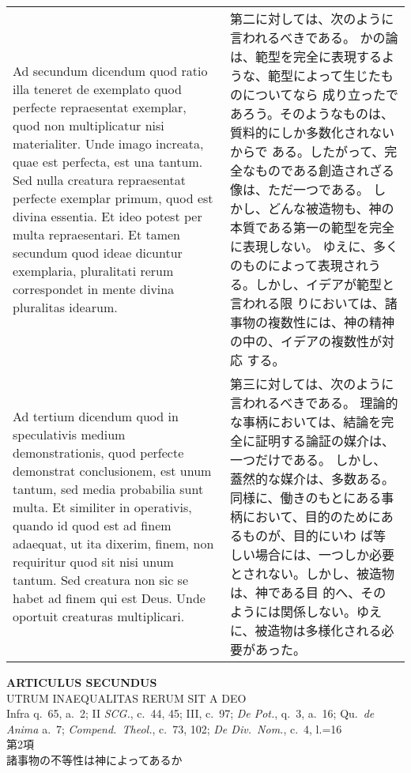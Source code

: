\documentclass[10pt]{jsarticle} %
\begin{document}
\begin{longtable}{p{21em}p{21em}}
\\





{\sc Ad secundum dicendum} quod ratio illa teneret
 de exemplato quod perfecte repraesentat exemplar, quod non
 multiplicatur nisi materialiter. Unde imago increata, quae est
 perfecta, est una tantum. Sed nulla creatura repraesentat perfecte
 exemplar primum, quod est divina essentia. Et ideo potest per multa
 repraesentari. Et tamen secundum quod ideae dicuntur exemplaria,
 pluralitati rerum correspondet in mente divina pluralitas idearum.

&

第二に対しては、次のように言われるべきである。
かの論は、範型を完全に表現するような、範型によって生じたものについてなら
 成り立ったであろう。そのようなものは、質料的にしか多数化されないからで
 ある。したがって、完全なものである創造されざる像は、ただ一つである。
しかし、どんな被造物も、神の本質である第一の範型を完全に表現しない。
ゆえに、多くのものによって表現されうる。しかし、イデアが範型と言われる限
 りにおいては、諸事物の複数性には、神の精神の中の、イデアの複数性が対応
 する。


\\





{\sc Ad tertium dicendum} quod in speculativis
 medium demonstrationis, quod perfecte demonstrat conclusionem, est unum
 tantum, sed media probabilia sunt multa. Et similiter in operativis,
 quando id quod est ad finem adaequat, ut ita dixerim, finem, non
 requiritur quod sit nisi unum tantum. Sed creatura non sic se habet ad
 finem qui est Deus. Unde oportuit creaturas multiplicari.


&

第三に対しては、次のように言われるべきである。
理論的な事柄においては、結論を完全に証明する論証の媒介は、一つだけである。
 しかし、蓋然的な媒介は、多数ある。
同様に、働きのもとにある事柄において、目的のためにあるものが、目的にいわ
 ば等しい場合には、一つしか必要とされない。しかし、被造物は、神である目
 的へ、そのようには関係しない。ゆえに、被造物は多様化される必要があった。




\end{longtable}
\newpage
{}

\begin{center}
 {\Large {\bf ARTICULUS SECUNDUS}}\\
 {\large UTRUM INAEQUALITAS RERUM SIT A DEO}\\
 {\footnotesize Infra q.~65, a.~2; II {\it SCG.}, c.~44, 45; III, c.~97;
 {\itshape De Pot.}, q.~3, a.~16; Qu.~{\itshape de Anima} a.~7;
 {\itshape Compend.~Theol.}, c.~73, 102; {\itshape De Div.~Nom.}, c.~4,
 l.=16}\\
{\Large 第2項\\諸事物の不等性は神によってあるか}
\end{center}
\end{document}
